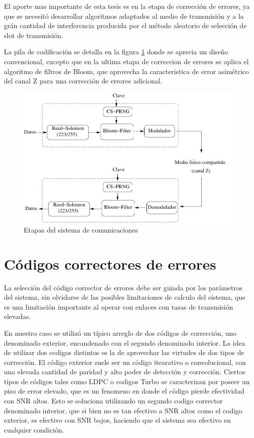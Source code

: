 El aporte mas importante de esta tesis es en la etapa de corrección de errores, ya que se necesitó desarrollar algoritmos adaptados al medio de transmisión y a la grán cantidad de interferencia producida por el método aleatorio de selección de slot de transmisión.

La pila de codificación se detalla en la figura \ref{fig_comstack} donde se aprecia un diseño convencional, excepto que en la ultima etapa de correccion de errores se aplica el algoritmo de filtros de Bloom, que aprovecha la caracteristica de error asimétrico del canal Z para una corrección de errores adicional.

\begin{figure}[t]
\centering
\includegraphics[width=4.5in]{graphs/Soft-stack3}
\caption{Etapas del sistema de comunicaciones}
\label{fig_comstack}
\end{figure}

\section{Códigos correctores de errores}

La selección del código corrector de errores debe ser guiada por los parámetros del sistema, sin olvidarse de las posibles limitaciones de calculo del sistema, que es una limitación importante al operar con enlaces con tasas de transmisión elevadas.

En nuestro caso se utilizó un típico arreglo de dos códigos de corrección, uno denominado exterior, encandenado con el segundo denominado interior.
La idea de utilizar dos codigos distintos es la de aprovechar las virtudes de dos tipos de corrección. El código exterior suele ser un código itearativo o convolucional, con una elevada cantidad de paridad y alto poder de detección y corrección. Ciertos tipos de códigos tales como LDPC o codigos Turbo se caracterizan por poseer un piso de error elevado, que es un fenomeno en donde el código pierde efectividad con SNR altos. Esto se soluciona utilizando un segundo codigo corrector denominado interior, que si bien no es tan efectivo a SNR altos como el codigo exterior, es efectivo con SNR bajos, haciendo que el sistema sea efectivo en cualquier condición.

